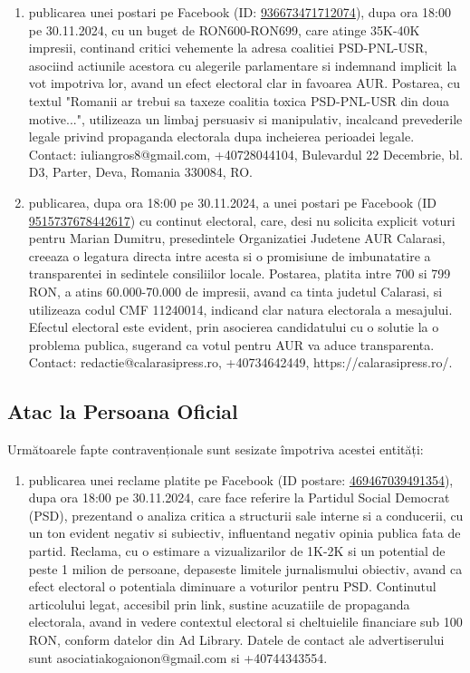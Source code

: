 \documentclass[a4paper,12pt]{article}
\begin{document}
\begin{enumerate}[leftmargin=*, label=\arabic*.)]
    \item publicarea unei postari pe Facebook (ID: \href{https://www.facebook.com/ads/library/?id=936673471712074}{936673471712074}), dupa ora 18:00 pe 30.11.2024, cu un buget de RON600-RON699, care atinge 35K-40K impresii,  continand critici vehemente la adresa coalitiei PSD-PNL-USR, asociind actiunile acestora cu alegerile parlamentare si indemnand implicit la vot impotriva lor, avand un efect electoral clar in favoarea AUR.  Postarea, cu textul "Romanii ar trebui sa taxeze coalitia toxica PSD-PNL-USR din doua motive...", utilizeaza un limbaj persuasiv si manipulativ,  incalcand prevederile legale privind propaganda electorala dupa incheierea perioadei legale.  Contact: iuliangros8@gmail.com, +40728044104, Bulevardul 22 Decembrie, bl. D3, Parter, Deva, Romania 330084, RO.
    \item publicarea, dupa ora 18:00 pe 30.11.2024, a unei postari pe Facebook (ID \href{https://www.facebook.com/ads/library/?id=9515737678442617}{9515737678442617}) cu continut electoral,  care, desi nu solicita explicit voturi pentru Marian Dumitru, presedintele Organizatiei Judetene AUR Calarasi, creeaza o legatura directa intre acesta si o promisiune de imbunatatire a transparentei in sedintele consiliilor locale.  Postarea, platita intre 700 si 799 RON, a atins 60.000-70.000 de impresii, avand ca tinta judetul Calarasi, si utilizeaza codul CMF 11240014, indicand clar natura electorala a mesajului.  Efectul electoral este evident, prin asocierea candidatului cu o solutie la o problema publica, sugerand ca votul pentru AUR va aduce transparenta.  Contact: redactie@calarasipress.ro, +40734642449, https://calarasipress.ro/.
\end{enumerate}

\vspace{0.5cm}

\subsection{Atac la Persoana Oficial}
Următoarele fapte contravenționale sunt sesizate împotriva acestei entități:

\begin{enumerate}[leftmargin=*, label=\arabic*.)]
    \item publicarea unei reclame platite pe Facebook (ID postare: \href{https://www.facebook.com/ads/library/?id=469467039491354}{469467039491354}), dupa ora 18:00 pe 30.11.2024, care face referire la Partidul Social Democrat (PSD), prezentand o analiza critica a structurii sale interne si a conducerii, cu un ton evident negativ si subiectiv, influentand negativ opinia publica fata de partid.  Reclama, cu o estimare a vizualizarilor de 1K-2K si un potential de peste 1 milion de persoane, depaseste limitele jurnalismului obiectiv, avand ca efect electoral o potentiala diminuare a voturilor pentru PSD.  Continutul articolului legat, accesibil prin link,  sustine acuzatiile de propaganda electorala, avand in vedere contextul electoral si cheltuielile financiare sub 100 RON, conform datelor din Ad Library.  Datele de contact ale advertiserului sunt asociatiakogaionon@gmail.com si +40744343554.
\end{enumerate}
\end{document}
